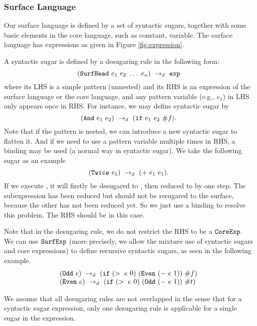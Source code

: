 \subsubsection{Surface Language}

Our surface language is defined by a set of syntactic sugars, together with some basic elements in the core language, such as constant, variable. The surface language has expressions as given in Figure \ref{fig:expression}.

A syntactic sugar is defined by a desugaring rule in the following form:
\[
(\mbox{\tt SurfHead}~e_1~e_2~\ldots~e_n) ~\rightarrow_d~ \mbox{\tt exp}
\]
where its LHS is a simple pattern (unnested) and its RHS is an expression of the surface language or the core language, and any pattern variable (e.g., $e_1$) in LHS only appears once in RHS. For instance, we may define syntactic sugar  by
\[
(\mbox{\tt And}~e_1~e_2) ~\rightarrow_d~ (\mbox{\tt if}~e_1~e_2~\#f).
\]
Note that if the pattern is nested, we can introduce a new syntactic sugar to flatten it. And if we need to use a pattern variable multiple times in RHS, a  binding may be used (a normal way in syntactic sugar). We take the following sugar as an example
\[
(\mbox{\tt Twice}~e_1) ~\rightarrow_d~ (+~e_1~e_1).
\]
If we execute , it will firstly be desugared to , then reduced to  by one step. The subexpression  has been reduced but should not be resugared to the surface, because the other  has not been reduced yet.
So we just use a  binding to resolve this problem. The RHS should be  in this case.

Note that in the desugaring rule, we do not restrict the RHS to be a $\mbox{\tt CoreExp}$. We can use $\mbox{\tt SurfExp}$ (more precisely, we allow the mixture use of syntactic sugars and core expressions) to define recursive syntactic sugars, as seen in the following example.
\[
\begin{array}{l}
(\mbox{\tt Odd}~e) ~\rightarrow_d~ (\mbox{\tt if}~(>~e~0)~(\mbox{\tt Even}~(-~e~1))~\#f)\\
(\mbox{\tt Even}~e) ~\rightarrow_d~ (\mbox{\tt if}~(>~e~0)~(\mbox{\tt Odd}~(-~e~1))~\#t)
\end{array}
\]

We assume that all desugaring rules are not overlapped in the sense that for a syntactic sugar expression, only one desugaring rule is applicable for a single sugar in the expression.


